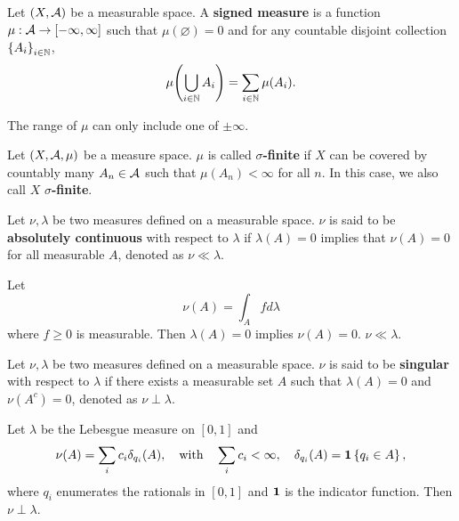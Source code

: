 \begin{definition}
    Let $(X,\mathcal{A})$ be a measurable space. A \textbf{signed measure} 
    is a function $\mu:\mathcal{A}\to [-\infty,\infty]$ such that $\mu(\varnothing) = 0$ 
    and for any countable disjoint collection $\left\{ {A_i} \right\}_{i\in\mathbb{N}}$,
    \begin{equation*}
        \mu\pth{\bigcup_{i\in\N} A_i} = \sum_{i\in\N} \mu(A_i).
    \end{equation*}
\end{definition}
\begin{remark}
    The range of $\mu$ can only include one of $\pm\infty$.
\end{remark}

\begin{definition}
    Let $(X,\mathcal{A},\mu)$ be a measure space. $\mu$ is called 
    \textbf{$\sigma$-finite} if $X$ can be covered by countably many 
    $A_n\in\mathcal{A}$ such that $\mu(A_n)<\infty$ for all $n$. In this case,
    we also call $X$ \textbf{$\sigma$-finite}.
\end{definition}

\begin{definition}
    Let $\nu,\lambda$ be two measures defined on a measurable space. $\nu$ 
    is said to be \textbf{absolutely continuous} with respect to $\lambda$ 
    if $\lambda(A) = 0$ implies that $\nu(A) = 0$ for all measurable $A$, 
    denoted as $\nu\ll\lambda$. 
\end{definition} 

\begin{example}
    Let 
    \begin{equation*}
        \nu(A) = \int_A fd\lambda
    \end{equation*}
    where $f\geq 0$ is measurable. Then $\lambda(A) = 0$ implies $\nu(A) = 0$. 
    $\nu\ll\lambda$. 
\end{example}

\begin{definition}
    Let $\nu,\lambda$ be two measures defined on a measurable space. $\nu$ 
    is said to be \textbf{singular} with respect to $\lambda$ if there exists 
    a measurable set $A$ such that $\lambda(A) = 0$ and $\nu(A^c) = 0$, 
    denoted as $\nu\perp\lambda$.
\end{definition}

\begin{example}
    Let $\lambda$ be the Lebesgue measure on $[0,1]$ and 
    \begin{equation*}
        \nu(A) = \sum_i c_i\delta_{q_i}(A), \quad \text{with}\quad 
        \sum_i c_i < \infty, \quad \delta_{q_i}(A) = \mathbf{1}\left\{ {q_i\in A} \right\},
    \end{equation*}
    where $q_i$ enumerates the rationals in $[0,1]$ and $\mathbf{1}$ is the 
    indicator function. Then $\nu\perp\lambda$.
\end{example} 

